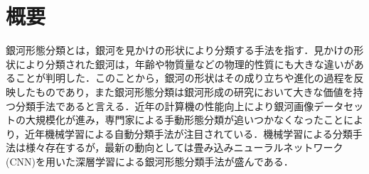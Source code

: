 \documentclass[a4j, 11pt]{jreport}
\newcounter{fiscal_year}         %
\begin{document}
\pagebreak
\addtocounter{page}{1}
\thispagestyle{empty}  %

\chapter*{概要}
銀河形態分類とは，銀河を見かけの形状により分類する手法を指す．見かけの形状により分類された銀河は，年齢や物質量などの物理的性質にも大きな違いがあることが判明した．このことから，銀河の形状はその成り立ちや進化の過程を反映したものであり，また銀河形態分類は銀河形成の研究において大きな価値を持つ分類手法であると言える．近年の計算機の性能向上により銀河画像データセットの大規模化が進み，専門家による手動形態分類が追いつかなくなったことにより，近年機械学習による自動分類手法が注目されている．機械学習による分類手法は様々存在するが，最新の動向としては畳み込みニューラルネットワーク(CNN)を用いた深層学習による銀河形態分類手法が盛んである．
\end{document}
